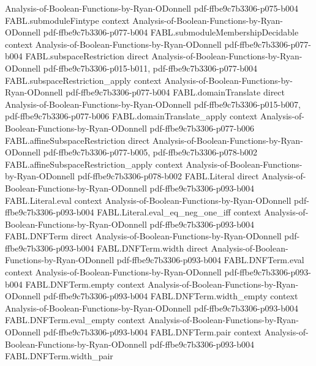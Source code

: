 \begin{theorem}
  {Analysis-of-Boolean-Functions-by-Ryan-ODonnell}
  {pdf-ffbe9c7b3306-p075-b004}
\proofstep
  {FABL.submoduleFintype}
  {context}
  {Analysis-of-Boolean-Functions-by-Ryan-ODonnell}
  {pdf-ffbe9c7b3306-p077-b004}
\proofstep
  {FABL.submoduleMembershipDecidable}
  {context}
  {Analysis-of-Boolean-Functions-by-Ryan-ODonnell}
  {pdf-ffbe9c7b3306-p077-b004}
\proofstep
  {FABL.subspaceRestriction}
  {direct}
  {Analysis-of-Boolean-Functions-by-Ryan-ODonnell}
  {pdf-ffbe9c7b3306-p015-b011,
    pdf-ffbe9c7b3306-p077-b004}
\proofstep
  {FABL.subspaceRestriction_apply}
  {context}
  {Analysis-of-Boolean-Functions-by-Ryan-ODonnell}
  {pdf-ffbe9c7b3306-p077-b004}
\proofstep
  {FABL.domainTranslate}
  {direct}
  {Analysis-of-Boolean-Functions-by-Ryan-ODonnell}
  {pdf-ffbe9c7b3306-p015-b007,
    pdf-ffbe9c7b3306-p077-b006}
\proofstep
  {FABL.domainTranslate_apply}
  {context}
  {Analysis-of-Boolean-Functions-by-Ryan-ODonnell}
  {pdf-ffbe9c7b3306-p077-b006}
\proofstep
  {FABL.affineSubspaceRestriction}
  {direct}
  {Analysis-of-Boolean-Functions-by-Ryan-ODonnell}
  {pdf-ffbe9c7b3306-p077-b005,
    pdf-ffbe9c7b3306-p078-b002}
\proofstep
  {FABL.affineSubspaceRestriction_apply}
  {context}
  {Analysis-of-Boolean-Functions-by-Ryan-ODonnell}
  {pdf-ffbe9c7b3306-p078-b002}
\proofstep
  {FABL.Literal}
  {direct}
  {Analysis-of-Boolean-Functions-by-Ryan-ODonnell}
  {pdf-ffbe9c7b3306-p093-b004}
\proofstep
  {FABL.Literal.eval}
  {context}
  {Analysis-of-Boolean-Functions-by-Ryan-ODonnell}
  {pdf-ffbe9c7b3306-p093-b004}
\proofstep
  {FABL.Literal.eval_eq_neg_one_iff}
  {context}
  {Analysis-of-Boolean-Functions-by-Ryan-ODonnell}
  {pdf-ffbe9c7b3306-p093-b004}
\proofstep
  {FABL.DNFTerm}
  {direct}
  {Analysis-of-Boolean-Functions-by-Ryan-ODonnell}
  {pdf-ffbe9c7b3306-p093-b004}
\proofstep
  {FABL.DNFTerm.width}
  {direct}
  {Analysis-of-Boolean-Functions-by-Ryan-ODonnell}
  {pdf-ffbe9c7b3306-p093-b004}
\proofstep
  {FABL.DNFTerm.eval}
  {context}
  {Analysis-of-Boolean-Functions-by-Ryan-ODonnell}
  {pdf-ffbe9c7b3306-p093-b004}
\proofstep
  {FABL.DNFTerm.empty}
  {context}
  {Analysis-of-Boolean-Functions-by-Ryan-ODonnell}
  {pdf-ffbe9c7b3306-p093-b004}
\proofstep
  {FABL.DNFTerm.width_empty}
  {context}
  {Analysis-of-Boolean-Functions-by-Ryan-ODonnell}
  {pdf-ffbe9c7b3306-p093-b004}
\proofstep
  {FABL.DNFTerm.eval_empty}
  {context}
  {Analysis-of-Boolean-Functions-by-Ryan-ODonnell}
  {pdf-ffbe9c7b3306-p093-b004}
\proofstep
  {FABL.DNFTerm.pair}
  {context}
  {Analysis-of-Boolean-Functions-by-Ryan-ODonnell}
  {pdf-ffbe9c7b3306-p093-b004}
\proofstep
  {FABL.DNFTerm.width_pair}

\end{theorem}
